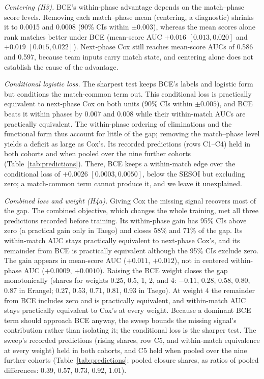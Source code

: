 \documentclass[sigconf,anonymous]{acmart}
\begin{document}
\emph{Centering (H3).} BCE's within-phase advantage depends on the match--phase score levels. Removing each match--phase mean (centering, a diagnostic) shrinks it to 0.0015 and 0.0008 (90\% CIs within $\pm0.003$), whereas the mean scores alone rank matches better under BCE (mean-score AUC $+0.016$ $[0.013,\allowbreak 0.020]$ and $+0.019$ $[0.015,\allowbreak 0.022]$). Next-phase Cox still reaches mean-score AUCs of 0.586 and 0.597, because team inputs carry match state, and centering alone does not establish the cause of the advantage.

\emph{Conditional logistic loss.} The sharpest test keeps BCE's labels and logistic form but conditions the match-common term out. This conditional loss is practically equivalent to next-phase Cox on both units (90\% CIs within $\pm0.005$), and BCE beats it within phases by 0.007 and 0.008 while their within-match AUCs are practically equivalent. The within-phase ordering of eliminations and the functional form thus account for little of the gap; removing the match--phase level yields a deficit as large as Cox's. Its recorded predictions (rows C1--C4) held in both cohorts and when pooled over the nine further cohorts (Table~\ref{tab:predictions}). There, BCE keeps a within-match edge over the conditional loss of $+0.0026$ $[0.0003,\allowbreak 0.0050]$, below the SESOI but excluding zero; a match-common term cannot produce it, and we leave it unexplained.

\emph{Combined loss and weight (H4a).} Giving Cox the missing signal recovers most of the gap. The combined objective, which changes the whole training, met all three predictions recorded before training. Its within-phase gain has 95\% CIs above zero (a practical gain only in Taego) and closes 58\% and 71\% of the gap. Its within-match AUC stays practically equivalent to next-phase Cox's, and its remainder from BCE is practically equivalent although the 95\% CIs exclude zero. The gain appears in mean-score AUC ($+0.011$, $+0.012$), not in centered within-phase AUC ($+0.0009$, $+0.0010$). Raising the BCE weight closes the gap monotonically (shares for weights 0.25, 0.5, 1, 2, and 4: $-0.11$, 0.28, 0.58, 0.80, 0.87 in Erangel; 0.27, 0.53, 0.71, 0.81, 0.93 in Taego). At weight 4 the remainder from BCE includes zero and is practically equivalent, and within-match AUC stays practically equivalent to Cox's at every weight. Because a dominant BCE term should approach BCE anyway, the sweep bounds the missing signal's contribution rather than isolating it; the conditional loss is the sharper test. The sweep's recorded predictions (rising shares, row C5, and within-match equivalence at every weight) held in both cohorts, and C5 held when pooled over the nine further cohorts (Table~\ref{tab:predictions}; pooled closure shares, as ratios of pooled differences: 0.39, 0.57, 0.73, 0.92, 1.01).
\end{document}
